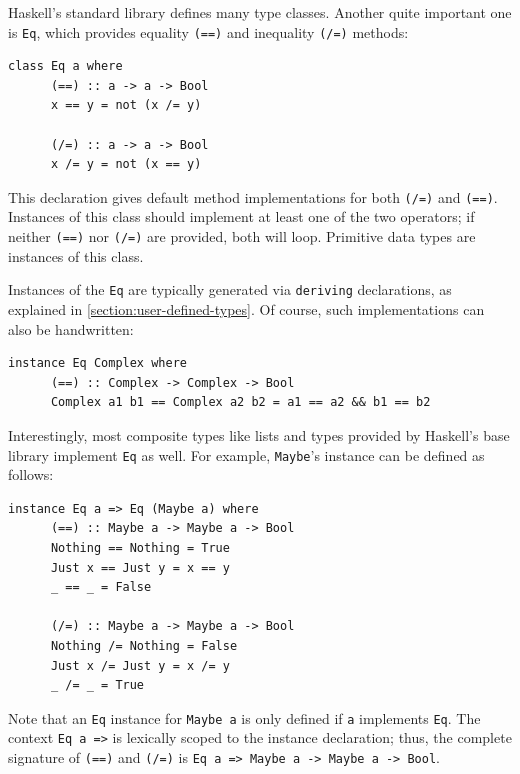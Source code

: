 \documentclass[UdineBachThesis,american,11pt]{PhdThesis}
\begin{document}
  Haskell's standard library defines many type classes. Another quite important
  one is \mbox{\texttt{Eq}}, which provides equality \mbox{\texttt{(==)}} and
  inequality \mbox{\texttt{(/=)}} methods:

  \begin{Verbatim}[gobble=4,fontsize=\small]
    class Eq a where
      (==) :: a -> a -> Bool
      x == y = not (x /= y)

      (/=) :: a -> a -> Bool
      x /= y = not (x == y)
  \end{Verbatim}

  This declaration gives default method implementations for both
  \mbox{\texttt{(/=)}} and \mbox{\texttt{(==)}}. Instances of this class should
  implement at least one of the two operators; if neither \mbox{\texttt{(==)}}
  nor \mbox{\texttt{(/=)}} are provided, both will loop. Primitive data types
  are instances of this class.

  Instances of the \mbox{\texttt{Eq}} are typically generated via
  \mbox{\texttt{deriving}} declarations, as explained in
  \autoref{section:user-defined-types}. Of course, such implementations can also
  be handwritten:

  \begin{Verbatim}[gobble=4,fontsize=\small]
    instance Eq Complex where
      (==) :: Complex -> Complex -> Bool
      Complex a1 b1 == Complex a2 b2 = a1 == a2 && b1 == b2
  \end{Verbatim}

  Interestingly, most composite types like lists and types provided by Haskell's
  base library implement \mbox{\texttt{Eq}} as well. For example,
  \mbox{\texttt{Maybe}}'s instance can be defined as follows:

  \begin{Verbatim}[gobble=4,fontsize=\small]
    instance Eq a => Eq (Maybe a) where
      (==) :: Maybe a -> Maybe a -> Bool
      Nothing == Nothing = True
      Just x == Just y = x == y
      _ == _ = False

      (/=) :: Maybe a -> Maybe a -> Bool
      Nothing /= Nothing = False
      Just x /= Just y = x /= y
      _ /= _ = True
  \end{Verbatim}

  Note that an \mbox{\texttt{Eq}} instance for \mbox{\texttt{Maybe a}} is only
  defined if \texttt{a} implements \mbox{\texttt{Eq}}. The context
  \mbox{\texttt{Eq a =>}} is lexically scoped to the instance declaration; thus,
  the complete signature of \mbox{\texttt{(==)}} and \mbox{\texttt{(/=)}} is
  \mbox{\texttt{Eq a => Maybe a -> Maybe a -> Bool}}.
\end{document}
